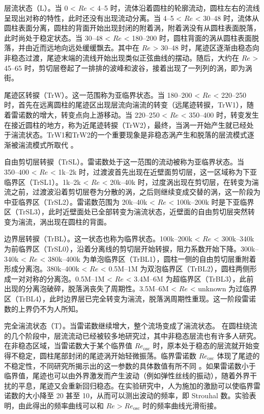 层流状态（L）。当 0 < $Re$ < 4--5 时，流体沿着圆柱的轮廓流动，圆柱左右的流线呈现出对称的特性，此时还没有出现流动分离。当 4--5 < $Re$ < 30--48 时，流体从圆柱表面分离，圆柱的背面开始出现封闭的附着涡，附着涡没有从圆柱表面脱落，此时尚处于稳定状态。当 30--48 < $Re$ < 180--200 时，圆柱背面的涡从圆柱表面脱落，并由近而远地向远处缓缓飘去。其中在 $Re$ > 30--48 时，尾迹区逐渐由稳态向非稳态过渡，尾迹末端的流线开始出现类似正弦曲线的摆动。随后，大约在 $Re$ > 45--65 时，剪切层卷起了一排排的波峰和波谷，接着出现了一列列的涡，即为涡街。

尾迹区转捩（TrW）。这一范围称为亚临界状态。当 180--200 < $Re$ < 220--250 时，首先在远离圆柱的尾迹区出现层流向湍流的转变（远尾迹转捩，TrW1），随着雷诺数的增大，转变点向上游移动。当 220--250 < $Re$ < 350--400 时，转变发生在接近圆柱的地方，称为近尾迹转捩（TrW2），最终，当涡一开始产生就已经处于湍流状态。TrW1和TrW2的一个重要现象是非稳态涡产生和脱落的层流模式逐渐被湍流模式所取代 \cite{zdravkovich1997flow}。

自由剪切层转捩（TrSL）。雷诺数处于这一范围的流动被称为亚临界状态。当 350--400 < $Re$ < 1k--2k 时，过渡波首先出现在近壁面剪切层，这一区域称为下亚临界区（TrSL1）。1k--2k < $Re$ < 20k--40k 时，过度涡出现在剪切层，在转变为湍流之前，过渡波沿着剪切层卷为分散的涡，之后则继续变成交替的涡，这一阶段为中亚临界区（TrSL2）。雷诺数范围为 20k--40k < $Re$ < 100k--200k 时是下亚临界区（TrSL3），此时近壁面处已全部转变为湍流状态，近壁面的自由剪切层突然转变为湍流，涡出现在圆柱的背面。

边界层转捩（TrBL）。这一状态也称为临界状态。100k--200k < $Re$ < 300k--340k 为前临界区（TrSL0），沿着分离线的剪切层开始转捩，阻力系数开始下降。300k--340k < $Re$ < 380k--400k 为单泡临界区（TrBL1），圆柱一侧的自由剪切层重附着形成分离泡。380k--400k < $Re$ < 0.5M--1M 为双泡临界区（TrBL2），圆柱两侧形成一对对称的分离泡。0.5M--1M < $Re$ < 3.4M--6M 为超临界区（TrBL3），此前出现的分离泡破碎，脱落涡丧失了周期性。3.5M--6M < $Re$ < unknown 为过临界区（TrBL4），此时边界层已完全转变为湍流，脱落涡周期性重现。这一阶段雷诺数的上界仍不为人所知。

完全湍流状态（T）。当雷诺数继续增大，整个流场变成了湍流状态。
在圆柱绕流的几个阶段中，层流流动已经被较多地研究过，其中非稳态层流也有许多人研究。在非稳态区域，当雷诺数大于某个临界值 $Re_\text{osc}$ 时，原本处于稳态的层流就开始变得不稳定，圆柱尾部封闭的尾迹涡开始轻微振荡。临界雷诺数 $Re_\text{osc}$ 体现了尾迹的不稳定性，不同研究所揭示出的这一参数的具体数值有所不同 \cite{zdravkovich1997flow}。如果雷诺数小于临界值，尾迹也可以由外界激发而产生波动（例如弹性丝线的振动），随着外界干扰的平息，尾迹又会重新回归稳态。在实验研究中，人为施加的激励可以使临界雷诺数的大小降至 20 甚至 10，从而可以测出波动的频率，即 Strouhal 数。实验表明，由此得出的频率曲线可以和 $Re>Re_\text{osc}$ 时的频率曲线光滑衔接。

